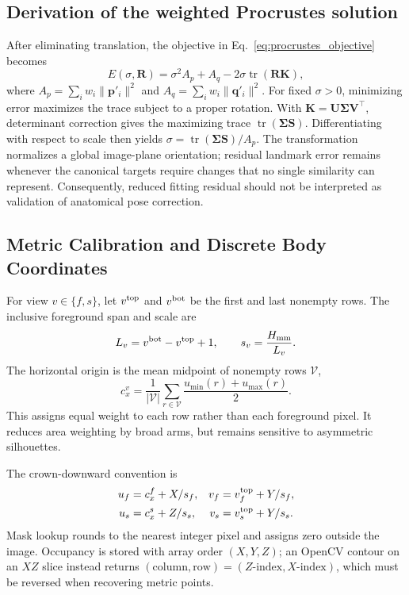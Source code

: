 \documentclass[11pt,a4paper]{article}
\numberwithin{equation}{section}
\begin{document}
\subsection{Derivation of the weighted Procrustes solution}
After eliminating translation, the objective in Eq.~\eqref{eq:procrustes_objective} becomes
\begin{equation}
E(\sigma,\mathbf R)=\sigma^2A_p+A_q-2\sigma\operatorname{tr}(\mathbf R\mathbf K),
\end{equation}
where $A_p=\sum_iw_i\|\mathbf p'_i\|^2$ and $A_q=\sum_iw_i\|\mathbf q'_i\|^2$. For fixed $\sigma>0$, minimizing error maximizes the trace subject to a proper rotation. With $\mathbf K=\mathbf U\mathbf\Sigma\mathbf V^\top$, determinant correction gives the maximizing trace $\operatorname{tr}(\mathbf\Sigma\mathbf S)$. Differentiating with respect to scale then yields $\sigma=\operatorname{tr}(\mathbf\Sigma\mathbf S)/A_p$. The transformation normalizes a global image-plane orientation; residual landmark error remains whenever the canonical targets require changes that no single similarity can represent. Consequently, reduced fitting residual should not be interpreted as validation of anatomical pose correction.

\subsection{Metric Calibration and Discrete Body Coordinates}
\label{subsec:calibration}
For view $v\in\{f,s\}$, let $v^{\rm top}$ and $v^{\rm bot}$ be the first and last nonempty rows. The inclusive foreground span and scale are
\begin{equation}
L_v=v^{\rm bot}-v^{\rm top}+1,\qquad s_v=\frac{H_{\rm mm}}{L_v}.
\label{eq:scale_front}
\end{equation}
The horizontal origin is the mean midpoint of nonempty rows $\mathcal V$,
\begin{equation}
c_x^v=\frac{1}{|\mathcal V|}\sum_{r\in\mathcal V}\frac{u_{\min}(r)+u_{\max}(r)}{2}.
\label{eq:centerline}
\end{equation}
This assigns equal weight to each row rather than each foreground pixel. It reduces area weighting by broad arms, but remains sensitive to asymmetric silhouettes.

The crown-downward convention is
\begin{align}
u_f&=c_x^f+X/s_f,&v_f&=v_f^{\rm top}+Y/s_f,\nonumber\\
u_s&=c_x^s+Z/s_s,&v_s&=v_s^{\rm top}+Y/s_s.
\label{eq:projection_coordinates}
\end{align}
Mask lookup rounds to the nearest integer pixel and assigns zero outside the image. Occupancy is stored with array order $(X,Y,Z)$; an OpenCV contour on an $XZ$ slice instead returns $(\text{column},\text{row})=(Z\text{-index},X\text{-index})$, which must be reversed when recovering metric points.
\end{document}
